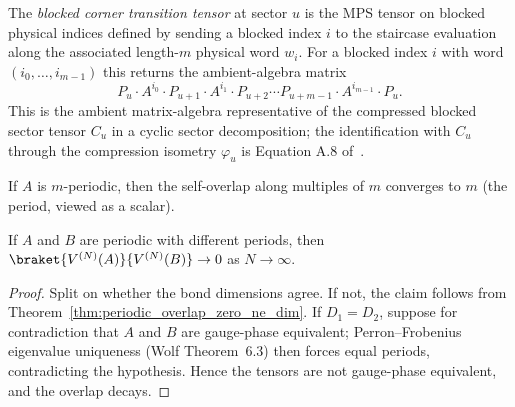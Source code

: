 \begin{definition}%
    \label{def:blocked_corner_transition_tensor}
    \leanok
    The \emph{blocked corner transition tensor} at sector $u$ is the
    MPS tensor on blocked physical indices defined by
    sending a blocked index $i$ to the staircase evaluation along the
    associated length-$m$ physical word $w_i$. For a
    blocked index $i$ with word $(i_0,\dotsc,i_{m-1})$ this returns the
    ambient-algebra matrix
    \[
        P_u \cdot A^{i_0} \cdot P_{u+1} \cdot A^{i_1} \cdot P_{u+2}
            \cdots P_{u+m-1} \cdot A^{i_{m-1}} \cdot P_u.
    \]
    This is the ambient matrix-algebra representative of the compressed
    blocked sector tensor $C_u$ in a cyclic sector decomposition; the
    identification with $C_u$ through the compression isometry $\varphi_u$
    is Equation A.8 of~\cite{DeLasCuevas2017Irreducible}.
\end{definition}

\begin{theorem}\label{thm:periodic_self_overlap_tendsto}
    \notready
    If $A$ is $m$-periodic, then the self-overlap along multiples of $m$
    converges to $m$ (the period, viewed as a scalar).
\end{theorem}

\begin{theorem}%
    \label{thm:periodic_overlap_zero_ne_period}
    \leanok
    If $A$ and $B$ are periodic with different periods, then
    $\braket{V^{(N)}(A)}{V^{(N)}(B)} \to 0$ as $N\to\infty$.
\end{theorem}
\begin{proof}\leanok
    Split on whether the bond dimensions agree. If not, the claim follows
    from Theorem~\ref{thm:periodic_overlap_zero_ne_dim}. If $D_1 = D_2$,
    suppose for contradiction that $A$ and $B$ are gauge-phase equivalent;
    Perron--Frobenius eigenvalue uniqueness (Wolf Theorem~6.3) then forces
    equal periods, contradicting the hypothesis. Hence the tensors are not
    gauge-phase equivalent, and the overlap decays.
\end{proof}


